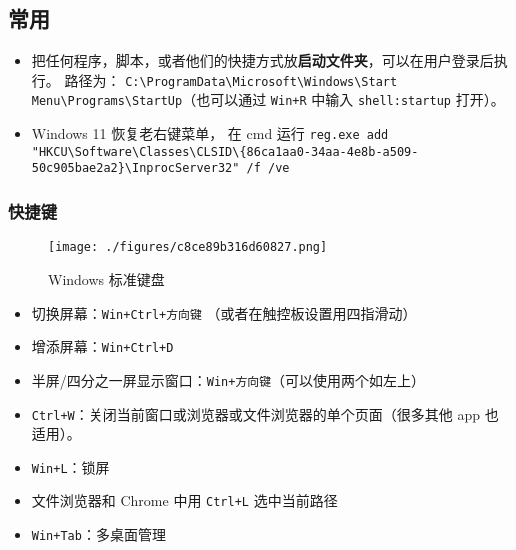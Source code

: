 
\subsection{常用}
\begin{itemize}
\item 把任何程序，脚本，或者他们的快捷方式放\textbf{启动文件夹}，可以在用户登录后执行。 路径为： \verb|C:\ProgramData\Microsoft\Windows\Start Menu\Programs\StartUp|（也可以通过 \verb|Win+R| 中输入 \verb|shell:startup| 打开）。
\item Windows 11 恢复老右键菜单， 在 cmd 运行 \verb`reg.exe add "HKCU\Software\Classes\CLSID\{86ca1aa0-34aa-4e8b-a509-50c905bae2a2}\InprocServer32" /f /ve`
\end{itemize}

\subsubsection{快捷键}
\begin{figure}[ht]
\centering
\texttt{[image: ./figures/c8ce89b316d60827.png]}
\caption{Windows 标准键盘} \label{fig_WinNt_1}
\end{figure}

\begin{itemize}
\item 切换屏幕：\verb|Win+Ctrl+方向键| （或者在触控板设置用四指滑动）
\item 增添屏幕：\verb|Win+Ctrl+D|
\item 半屏/四分之一屏显示窗口：\verb|Win+方向键|（可以使用两个如左上）
\item \verb|Ctrl+W|：关闭当前窗口或浏览器或文件浏览器的单个页面（很多其他 app 也适用）。
\item \verb|Win+L|：锁屏
\item 文件浏览器和 Chrome 中用 \verb|Ctrl+L| 选中当前路径
\item \verb|Win+Tab|：多桌面管理
\end{itemize}

